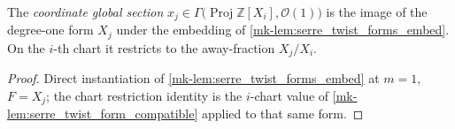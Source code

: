 \begin{definition}\label{mk-def:coordinate_section}
  \leanok

  The \emph{coordinate global section} \(x_j \in \Gamma\bigl(
  \operatorname{Proj} \mathbb Z[X_i], \mathcal O(1)\bigr)\) is the image of
  the degree-one form \(X_j\) under the embedding of
  \ref{mk-lem:serre_twist_forms_embed}. On the \(i\)-th chart it restricts to
  the away-fraction \(X_j/X_i\).
\end{definition}
\begin{proof}
  \leanok{}
  Direct instantiation of \ref{mk-lem:serre_twist_forms_embed} at
  \(m = 1\), \(F = X_j\); the chart restriction identity is the \(i\)-chart
  value of \ref{mk-lem:serre_twist_form_compatible} applied to that same form.
\end{proof}

